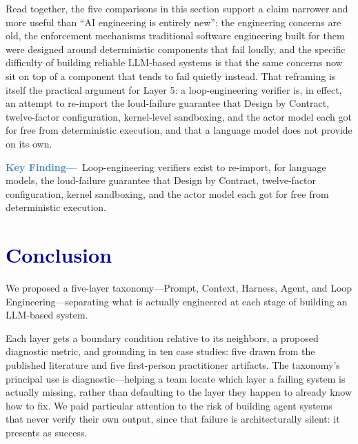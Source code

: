 \documentclass[journal]{IEEEtran}
\begin{document}
Read together, the five comparisons in this section support a claim narrower and more useful than ``AI engineering is entirely new'': the engineering concerns are old, the enforcement mechanisms traditional software engineering built for them were designed around deterministic components that fail loudly, and the specific difficulty of building reliable LLM-based systems is that the same concerns now sit on top of a component that tends to fail quietly instead. That reframing is itself the practical argument for Layer 5: a loop-engineering verifier is, in effect, an attempt to re-import the loud-failure guarantee that Design by Contract, twelve-factor configuration, kernel-level sandboxing, and the actor model each got for free from deterministic execution, and that a language model does not provide on its own.

\begin{mdframed}[linecolor=steelblue, linewidth=1.2pt, backgroundcolor=steelblue!6,
  innerleftmargin=8pt, innerrightmargin=8pt, innertopmargin=6pt, innerbottommargin=6pt,
  roundcorner=4pt]
\noindent\textbf{\textcolor{steelblue}{Key Finding---}}~Loop-engineering verifiers exist to re-import, for language models, the loud-failure guarantee that Design by Contract, twelve-factor configuration, kernel sandboxing, and the actor model each got for free from deterministic execution.
\end{mdframed}

\section{\textcolor{darkblue}{Conclusion}}

We proposed a five-layer taxonomy---Prompt, Context, Harness, Agent, and Loop Engineering---separating what is actually engineered at each stage of building an LLM-based system.

Each layer gets a boundary condition relative to its neighbors, a proposed diagnostic metric, and grounding in ten case studies: five drawn from the published literature and five first-person practitioner artifacts. The taxonomy's principal use is diagnostic---helping a team locate which layer a failing system is actually missing, rather than defaulting to the layer they happen to already know how to fix. We paid particular attention to the risk of building agent systems that never verify their own output, since that failure is architecturally silent: it presents as success.
\end{document}

